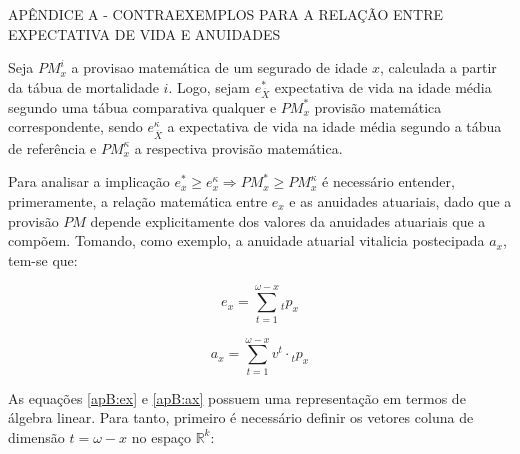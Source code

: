 \newpage
\appendix 



\begin{center}
    APÊNDICE A - CONTRAEXEMPLOS PARA A RELAÇÃO ENTRE EXPECTATIVA DE VIDA E ANUIDADES
\end{center}

\renewcommand{\thechapter}{Apêndice A}
\label{apendice_A}

\setcounter{equation}{0}
\renewcommand{\theequation}{A.\arabic{equation}}

Seja $PM^{i}_{x}$ a provisao matemática de um segurado de idade $x$, calculada a partir da tábua de mortalidade $i$. Logo, sejam $e^{*}_{\overline{X}}$  expectativa de vida na idade média segundo uma tábua comparativa qualquer e $PM^{*}_{x}$ provisão matemática correspondente, sendo $e^{\kappa}_{\overline{X}}$ a expectativa de vida na idade média segundo a tábua de referência e $PM^{\kappa}_{x}$ a respectiva provisão matemática.

Para analisar a implicação $e^{*}_{x} \geq e^{\kappa}_{x} \Rightarrow PM^{*}_{x} \geq PM^{\kappa}_{x}$ é necessário entender, primeramente, a relação matemática entre $e_{x}$ e as anuidades atuariais, dado que a provisão $PM$ depende explicitamente dos valores da anuidades atuariais que a compõem. Tomando, como exemplo, a anuidade atuarial vitalicia postecipada $a_{x}$, tem-se que:

\begin{equation}
    e_{x} = \sum_{t=1}^{\omega - x} {}_{t}p_x
    \label{apB:ex}
\end{equation}

\begin{equation}
    a_{x} = \sum_{t=1}^{\omega - x} v^t \cdot {}_{t}p_x
    \label{apB:ax}
\end{equation}

As equações \ref{apB:ex} e \ref{apB:ax} possuem uma representação em termos de álgebra linear. Para tanto, primeiro é necessário definir os vetores coluna de dimensão $t = \omega - x$ no espaço $\mathbb{R}^k$:


